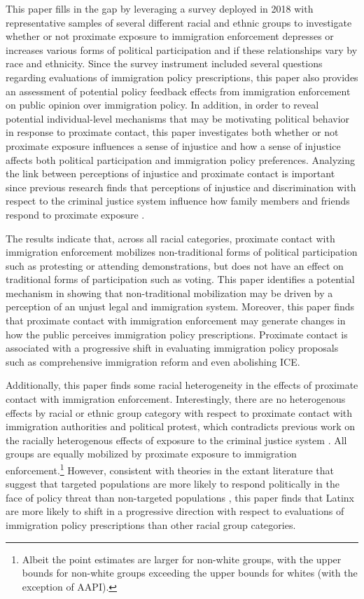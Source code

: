 \documentclass[10pt,]{article}
\begin{document}
This paper fills in the gap by leveraging a survey deployed in 2018 with
representative samples of several different racial and ethnic groups to
investigate whether or not proximate exposure to immigration enforcement
depresses or increases various forms of political participation and if
these relationships vary by race and ethnicity. Since the survey
instrument included several questions regarding evaluations of
immigration policy prescriptions, this paper also provides an assessment
of potential policy feedback effects from immigration enforcement on
public opinion over immigration policy. In addition, in order to reveal
potential individual-level mechanisms that may be motivating political
behavior in response to proximate contact, this paper investigates both
whether or not proximate exposure influences a sense of injustice and
how a sense of injustice affects both political participation and
immigration policy preferences. Analyzing the link between perceptions
of injustice and proximate contact is important since previous research
finds that perceptions of injustice and discrimination with respect to
the criminal justice system influence how family members and friends
respond to proximate exposure \citep{walkertargeted:nodate}.

The results indicate that, across all racial categories, proximate
contact with immigration enforcement mobilizes non-traditional forms of
political participation such as protesting or attending demonstrations,
but does not have an effect on traditional forms of participation such
as voting. This paper identifies a potential mechanism in showing that
non-traditional mobilization may be driven by a perception of an unjust
legal and immigration system. Moreover, this paper finds that proximate
contact with immigration enforcement may generate changes in how the
public perceives immigration policy prescriptions. Proximate contact is
associated with a progressive shift in evaluating immigration policy
proposals such as comprehensive immigration reform and even abolishing
ICE.

Additionally, this paper finds some racial heterogeneity in the effects
of proximate contact with immigration enforcement. Interestingly, there
are no heterogenous effects by racial or ethnic group category with
respect to proximate contact with immigration authorities and political
protest, which contradicts previous work on the racially heterogenous
effects of exposure to the criminal justice system
\citep{walkerextending2014, walkertargeted:nodate}. All groups are
equally mobilized by proximate exposure to immigration
enforcement.\footnote{Albeit the point estimates are larger for
  non-white groups, with the upper bounds for non-white groups exceeding
  the upper bounds for whites (with the exception of AAPI).} However,
consistent with theories in the extant literature that suggest that
targeted populations are more likely to respond politically in the face
of policy threat than non-targeted populations
\citep{pantojafear2003, kangelectoral2017, laniyonupolitical2018}, this
paper finds that Latinx are more likely to shift in a progressive
direction with respect to evaluations of immigration policy
prescriptions than other racial group categories.
\end{document}
